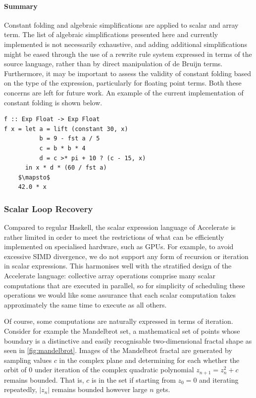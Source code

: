 \paragraph{Summary}

Constant folding and algebraic simplifications are applied to scalar and array
term. The list of algebraic simplifications presented here and currently
implemented is not necessarily exhaustive, and adding additional simplifications
might be eased through the use of a rewrite rule system expressed in terms of
the source language, rather than by direct manipulation of de Bruijn terms.
Furthermore, it may be important to assess the validity of constant folding
based on the type of the expression, particularly for floating point
terms. Both these concerns are left for future work. An example of the current
implementation of constant folding is shown below.

\begin{lstlisting}[style=Haskell,mathescape,caption={Example of constant expression evaluation}]
f :: Exp Float -> Exp Float
f x = let a = lift (constant 30, x)
          b = 9 - fst a / 5
          c = b * b * 4
          d = c >* pi + 10 ? (c - 15, x)
      in x * d * (60 / fst a)
    $\mapsto$
    42.0 * x
\end{lstlisting}



\subsubsection{Scalar Loop Recovery}

Compared to regular Haskell, the scalar expression language of Accelerate is
rather limited in order to meet the restrictions of what can be efficiently
implemented on specialised hardware, such as GPUs. For example, to avoid
excessive SIMD divergence, we do not support any form of recursion or iteration
in scalar expressions. This harmonises well with the stratified design of the
Accelerate language: collective array operations comprise many scalar
computations that are executed in parallel, so for simplicity of scheduling
these operations we would like some assurance that each scalar computation takes
approximately the same time to execute as all others.

 Of course, some
computations are naturally expressed in terms of iteration. Consider for example
the Mandelbrot set, a mathematical set of points whose boundary is a distinctive
and easily recognisable two-dimensional fractal shape as seen in
\autoref{fig:mandelbrot}. Images of the Mandelbrot fractal are generated by
sampling values $c$ in the complex plane and determining for each whether the
orbit of 0 under iteration of the complex quadratic polynomial $z_{n+1} =
z_{n}^{2} + c$ remains bounded. That is, $c$ is in the set if starting from $z_0
= 0$ and iterating repeatedly, $\left|z_n\right|$ remains bounded however large
$n$ gets.

